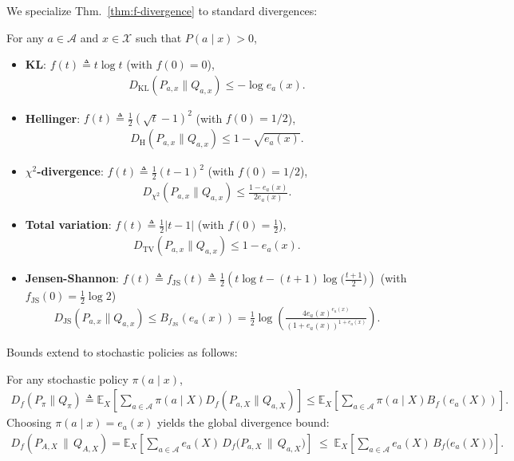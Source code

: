 We specialize Thm.~\ref{thm:f-divergence} to standard divergences:
{
\renewcommand{\thecorollary}{T1.1}
\begin{corollary}\label{cor:f-divergence}
    \normalfont
    For any $a \in \mathcal{A}$ and $x \in \mathcal{X}$ such that $P(a \mid x) > 0$, 
    \begin{itemize}[leftmargin=*,itemsep=0pt]
        \item \textbf{KL}: $f(t) \triangleq t \log t$ (with $f(0) = 0$), 
        \begin{align}
            D_{\mathrm{KL}}(P_{a,x} \| Q_{a,x}) \leq -\log e_a(x).   
        \end{align}
        \item \textbf{Hellinger}: $f(t) \triangleq \tfrac{1}{2}(\sqrt{t}-1)^2 $ (with $f(0) = 1/2$), 
        \begin{align}
            D_{\mathrm{H}}(P_{a,x} \| Q_{a,x}) \leq 1- \sqrt{e_a(x)}.
        \end{align}
        \item \textbf{$\chi^2$-divergence}: $f(t) \triangleq \tfrac{1}{2}(t-1)^2 $ (with $f(0) = 1/2$), 
        \begin{align}
            D_{\chi^2}(P_{a,x} \| Q_{a,x}) \leq \frac{1-e_a(x)}{2e_a(x)}.
        \end{align}
        \item \textbf{Total variation}: $f(t) \triangleq \frac{1}{2}|t-1| $ (with $f(0) = \frac{1}{2}$), 
        \begin{align}
            D_{\mathrm{TV}}(P_{a,x} \| Q_{a,x}) \leq 1-e_a(x).
        \end{align}
        \item \textbf{Jensen-Shannon}: $f(t) \triangleq f_{\mathrm{JS}}(t) \triangleq  \frac{1}{2}\left(t\log t - (t+1)\log\!\Big(\tfrac{t+1}{2}\Big)\right)$ (with $f_{\mathrm{JS}}(0)=\frac{1}{2}\log 2$)  
        \begin{align}
            D_{\mathrm{JS}}(P_{a,x} \| Q_{a,x}) \leq B_{f_{\mathrm{JS}}}(e_a(x)) = \frac{1}{2}\log \left( \frac{4 e_a(x)^{e_a(x)}}{(1+e_a(x))^{1+e_a(x)}} \right).
        \end{align}
    \end{itemize}
\end{corollary}
}
Bounds extend to stochastic policies as follows:
{
\renewcommand{\thecorollary}{T1.2}
\begin{corollary}\label{coro:soft}
    \normalfont
    For any stochastic policy $\pi(a \mid x)$, 
    \begin{align}
        D_{f}( P_{\pi} \|  Q_{\pi} ) \triangleq \mathbb{E}_{X}\left[\sum_{a \in \mathcal{A} }\pi(a \mid X) D_{f}( P_{a,X} \|  Q_{a,X} )\right]   \leq \mathbb{E}_{X}\left[ \sum_{a \in \mathcal{A}} \pi(a \mid X)B_f(e_a(X)) \right]. \nonumber
    \end{align}
    Choosing $\pi(a \mid x) = e_a(x)$ yields the global divergence bound: 
    \begin{align}
        D_f(P_{A,X} \,\|\, Q_{A,X})= \mathbb{E}_{X}\!\left[\sum_{a\in\mathcal{A}} e_a(X)\, D_f\!\big(P_{a,X}\,\|\,Q_{a,X}\big)\right] \;\le\; \mathbb{E}_{X}\!\left[\sum_{a\in\mathcal{A}} e_a(X)\, B_f\!\big(e_a(X)\big)\right].\nonumber
    \end{align}
\end{corollary}
}
